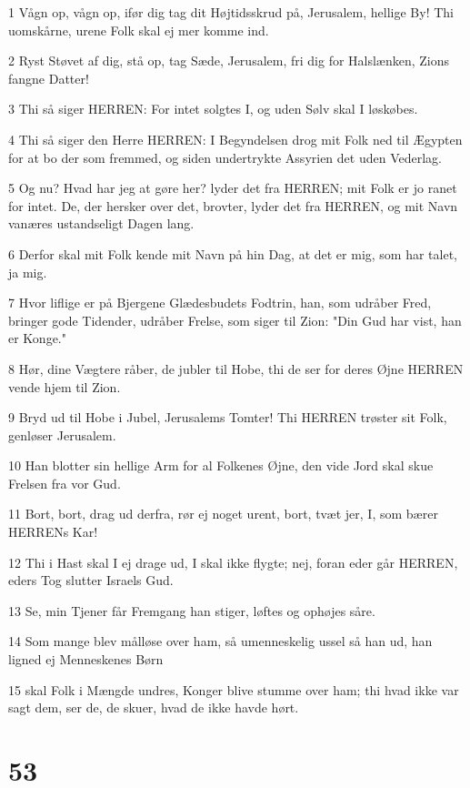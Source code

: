 \par 1 Vågn op, vågn op, ifør dig tag dit Højtidsskrud på, Jerusalem, hellige By! Thi uomskårne, urene Folk skal ej mer komme ind.
\par 2 Ryst Støvet af dig, stå op, tag Sæde, Jerusalem, fri dig for Halslænken, Zions fangne Datter!
\par 3 Thi så siger HERREN: For intet solgtes I, og uden Sølv skal I løskøbes.
\par 4 Thi så siger den Herre HERREN: I Begyndelsen drog mit Folk ned til Ægypten for at bo der som fremmed, og siden undertrykte Assyrien det uden Vederlag.
\par 5 Og nu? Hvad har jeg at gøre her? lyder det fra HERREN; mit Folk er jo ranet for intet. De, der hersker over det, brovter, lyder det fra HERREN, og mit Navn vanæres ustandseligt Dagen lang.
\par 6 Derfor skal mit Folk kende mit Navn på hin Dag, at det er mig, som har talet, ja mig.
\par 7 Hvor liflige er på Bjergene Glædesbudets Fodtrin, han, som udråber Fred, bringer gode Tidender, udråber Frelse, som siger til Zion: "Din Gud har vist, han er Konge."
\par 8 Hør, dine Vægtere råber, de jubler til Hobe, thi de ser for deres Øjne HERREN vende hjem til Zion.
\par 9 Bryd ud til Hobe i Jubel, Jerusalems Tomter! Thi HERREN trøster sit Folk, genløser Jerusalem.
\par 10 Han blotter sin hellige Arm for al Folkenes Øjne, den vide Jord skal skue Frelsen fra vor Gud.
\par 11 Bort, bort, drag ud derfra, rør ej noget urent, bort, tvæt jer, I, som bærer HERRENs Kar!
\par 12 Thi i Hast skal I ej drage ud, I skal ikke flygte; nej, foran eder går HERREN, eders Tog slutter Israels Gud.
\par 13 Se, min Tjener får Fremgang han stiger, løftes og ophøjes såre.
\par 14 Som mange blev målløse over ham, så umenneskelig ussel så han ud, han ligned ej Menneskenes Børn
\par 15 skal Folk i Mængde undres, Konger blive stumme over ham; thi hvad ikke var sagt dem, ser de, de skuer, hvad de ikke havde hørt.

\chapter{53}

